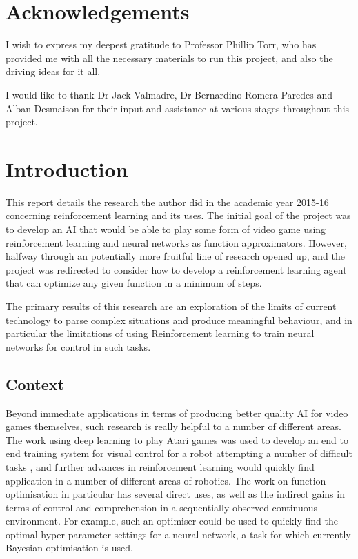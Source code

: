 \section{Acknowledgements}
I wish to express my deepest gratitude to Professor Phillip Torr, who has provided me with all the necessary materials to run this project, and also the driving ideas for it all.

I would like to thank Dr Jack Valmadre, Dr Bernardino Romera Paredes and Alban Desmaison
for their input and assistance at various stages throughout this project.
\section{Introduction}
This report details the research the author did in the academic year 2015-16 concerning reinforcement learning and its uses. The initial goal of the project was to develop an AI that would be able to play some form of video game using reinforcement learning and neural networks as function approximators. However, halfway through an potentially more fruitful line of research opened up, and the project was redirected to consider how to develop a reinforcement learning agent that can optimize any given function in a minimum of steps.

The primary results of this research are an exploration of the limits of current technology to parse complex situations and produce meaningful behaviour, and in particular the limitations of using Reinforcement learning to train neural networks for control in such tasks.

\subsection{Context}
Beyond immediate applications in terms of producing better quality AI for video games themselves, such research is really helpful to a number of different areas. The work using deep learning to play Atari games \cite{atariDQN} was used to develop an end to end training system for visual control for a robot attempting a number of difficult tasks \cite{levine2015end}, and further advances in reinforcement learning would quickly find application in a number of different areas of robotics. The work on function optimisation in particular has several direct uses, as well as the indirect gains in terms of control and comprehension in a sequentially observed continuous environment. For example, such an optimiser could be used to quickly find the optimal hyper parameter settings for  a neural network, a task for which currently Bayesian optimisation is used.

